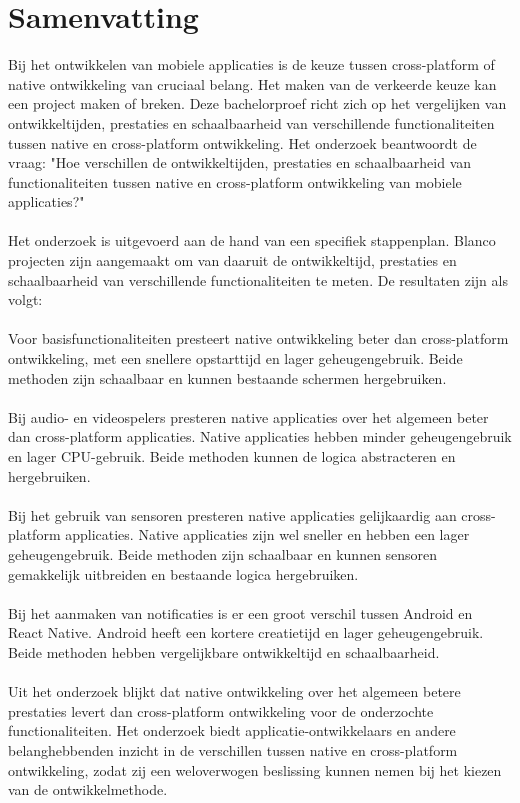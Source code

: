 \chapter{Samenvatting}
Bij het ontwikkelen van mobiele applicaties is de keuze tussen cross-platform of native 
ontwikkeling van cruciaal belang. Het maken van de verkeerde keuze kan een project 
maken of breken. Deze bachelorproef richt zich op het vergelijken van 
ontwikkeltijden, prestaties en schaalbaarheid van verschillende functionaliteiten tussen
native en cross-platform ontwikkeling. Het onderzoek beantwoordt de vraag: "Hoe verschillen 
de ontwikkeltijden, prestaties en schaalbaarheid van functionaliteiten tussen native en 
cross-platform ontwikkeling van mobiele applicaties?"
\\\\
Het onderzoek is uitgevoerd aan de hand van een specifiek stappenplan. Blanco projecten 
zijn aangemaakt om van daaruit de ontwikkeltijd, prestaties en schaalbaarheid van verschillende 
functionaliteiten te meten. De resultaten zijn als volgt:
\\\\
Voor basisfunctionaliteiten presteert native ontwikkeling beter dan cross-platform 
ontwikkeling, met een snellere opstarttijd en lager geheugengebruik. Beide methoden 
zijn schaalbaar en kunnen bestaande schermen hergebruiken.
\\\\
Bij audio- en videospelers presteren native applicaties over het algemeen beter dan 
cross-platform applicaties. Native applicaties hebben minder geheugengebruik en lager 
CPU-gebruik. Beide methoden kunnen de logica abstracteren en hergebruiken.
\\\\
Bij het gebruik van sensoren presteren native applicaties gelijkaardig aan cross-platform applicaties. 
Native applicaties zijn wel sneller en hebben een lager geheugengebruik. Beide methoden zijn 
schaalbaar en kunnen sensoren gemakkelijk uitbreiden en bestaande logica hergebruiken.
\\\\
Bij het aanmaken van notificaties is er een groot verschil tussen Android en React 
Native. Android heeft een kortere creatietijd en lager geheugengebruik. Beide methoden hebben 
vergelijkbare ontwikkeltijd en schaalbaarheid.
\\\\
Uit het onderzoek blijkt dat native ontwikkeling over het algemeen betere prestaties 
levert dan cross-platform ontwikkeling voor de onderzochte functionaliteiten. Het onderzoek 
biedt applicatie-ontwikkelaars en andere belanghebbenden inzicht in de verschillen tussen 
native en cross-platform ontwikkeling, zodat zij een weloverwogen beslissing kunnen nemen 
bij het kiezen van de ontwikkelmethode.


